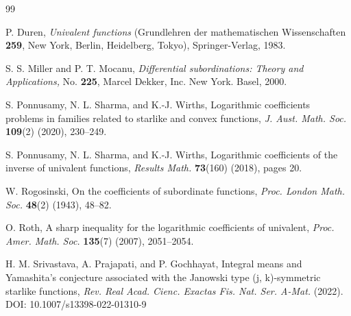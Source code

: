 \documentclass[12pt]{amsart}
\numberwithin{equation}{section}
\theoremstyle{definition}
\numberwithin{equation}{section}
\begin{document}
\begin{thebibliography}{99}

  {P. Duren},
\textit{Univalent functions}
(Grundlehren der mathematischen Wissenschaften {\bf 259}, New York, Berlin, Heidelberg, Tokyo),
Springer-Verlag, 1983.

  {S. S. Miller and P. T. Mocanu},
\textit{Differential subordinations: Theory and Applications,} No. {\bf 225},
Marcel Dekker, Inc. New York. Basel, 2000.

 {S. Ponnusamy, N. L. Sharma, and K.-J. Wirths},
{Logarithmic coefficients problems in families related to starlike and convex functions}, 
\textit{J. Aust. Math. Soc.}  \textbf{109}(2) (2020), 230--249.

 {S. Ponnusamy, N. L. Sharma, and K.-J. Wirths},
{Logarithmic coefficients of the inverse of univalent functions}, 
\textit{Results Math.} \textbf{73}(160) (2018), pages 20.


 {W. Rogosinski,}
{On the coefficients of subordinate functions},
\textit{Proc. London Math. Soc.} \textbf{48}(2) (1943), 48--82.

 {O. Roth,}
{A sharp inequality for the logarithmic coefficients of univalent},
\textit{Proc. Amer. Math. Soc.} \textbf{135}(7) (2007), 2051--2054.

 {H. M. Srivastava, A. Prajapati, and P. Gochhayat},
{Integral means and Yamashita’s conjecture associated with the Janowski type (j, k)-symmetric starlike functions}, 
\textit{Rev. Real Acad. Cienc. Exactas Fis. Nat. Ser. A-Mat.}  (2022). DOI: 10.1007/s13398-022-01310-9




\end{thebibliography}
\end{document}

